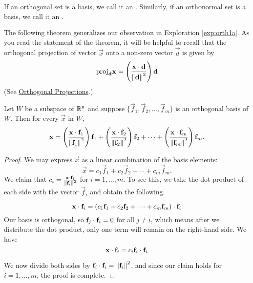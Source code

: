 \documentclass{ximera}
\begin{document}
If an orthogonal set is a basis, we call it an
. Similarly, if an orthonormal set is a basis, we call it an .


The following theorem generalizes our observation in Exploration \ref{exp:orth1a}.  As you read the statement of the theorem, it will be helpful to recall that the orthogonal projection of vector $\vec{x}$ onto a non-zero vector $\vec{d}$ is given by
\begin{equation}\label{eq:orthProj}
\mbox{proj}_{\mathbf{d}}\mathbf{x}=\left(\frac{\mathbf{x}\cdot\mathbf{d}}{\left\lVert\mathbf{d}\right\rVert^2}\right)\mathbf{d}
\end{equation}
(See \href{\xmbaseurl/VEC-0070/main}{Orthogonal Projections}.)

\begin{theorem}\label{th:fourierexpansion}
Let $W$ be a subspace of $\mathbb{R}^n$ and suppose $\{ \vec{f}_1, \vec{f}_2, \ldots, \vec{f}_m \}$
is an orthogonal basis of $W$.
Then for every $\vec{x}$ in $W$,
\begin{equation}\label{FourierEqn}
\mathbf{x} =
\left(\frac{\mathbf{x}\cdot \mathbf{f}_1}{\left\lVert\mathbf{f}_1\right\rVert^2}\right) \mathbf{f}_1 +
\left(\frac{\mathbf{x}\cdot \mathbf{f}_2}{\left\lVert\mathbf{f}_2\right\rVert^2}\right) \mathbf{f}_2 +
\cdots +
\left(\frac{\mathbf{x}\cdot \mathbf{f}_m}{\left\lVert\mathbf{f}_m\right\rVert^2}\right) \mathbf{f}_m.
\end{equation}
\end{theorem}

\begin{proof}
We may express $\vec{x}$ as a linear combination of the basis elements:
\[ \vec{x} =
c_1 \vec{f}_1 +
c_2 \vec{f}_2 +
\cdots +
c_m \vec{f}_m.
\]
We claim that $c_i = \frac{\mathbf{x}\cdot \mathbf{f}_i}{\left\lVert\mathbf{f}_i\right\rVert^2}$ for $i=1,\ldots,m$. To see this, we take the dot product of
each side with the vector $\vec{f}_i$ and obtain the following.

\begin{equation*}
  \mathbf{x} \cdot \mathbf{f}_i =  \left(c_1\mathbf{f}_1 +
c_2\mathbf{f}_2 +
\cdots +
c_m\mathbf{f}_m\right) \cdot \mathbf{f}_i 
\end{equation*}
Our basis is orthogonal, so $\mathbf{f}_j \cdot \mathbf{f}_i = 0$ for all $j \neq i$, which means after we distribute the dot product, only one term will remain on the right-hand side.  We have 
\begin{equation*}
  \mathbf{x} \cdot \mathbf{f}_i =  c_i\mathbf{f}_i \cdot \mathbf{f}_i 
\end{equation*}

We now divide both sides by $\mathbf{f}_i \cdot \mathbf{f}_i = \left\lVert\mathbf{f}_i\right\rVert^2$, and since our claim holds for $i=1,\ldots,m$, the proof is complete.
\end{proof}
\end{document}
